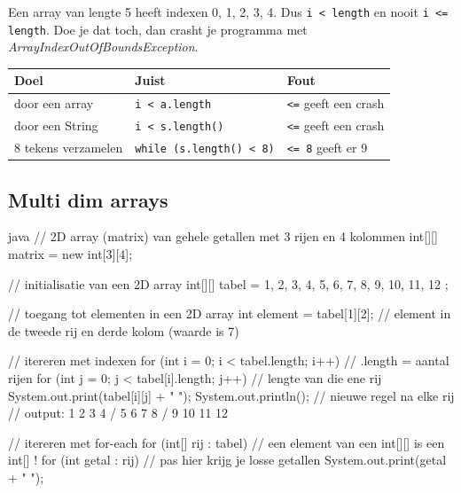 \documentclass[a4paper,11pt]{article}
\begin{document}
\begin{warningbox}
    Een array van lengte 5 heeft indexen 0, 1, 2, 3, 4. Dus \texttt{i < length} en
    nooit \texttt{i <= length}. Doe je dat toch, dan crasht je programma met
    \textit{ArrayIndexOutOfBoundsException}.


    \medskip
    \begin{tabular}{@{}lll@{}}
        \toprule
        \textbf{Doel}       & \textbf{Juist}                  & \textbf{Fout}               \\
        \midrule
        door een array      & \texttt{i < a.length}           & \texttt{<=} geeft een crash \\
        door een String     & \texttt{i < s.length()}         & \texttt{<=} geeft een crash \\
        8 tekens verzamelen & \texttt{while (s.length() < 8)} & \texttt{<= 8} geeft er 9    \\
        \bottomrule
    \end{tabular}
\end{warningbox}


\subsection{Multi dim arrays}

\begin{codeblock}{java}
    // 2D array (matrix) van gehele getallen met 3 rijen en 4 kolommen
    int[][] matrix = new int[3][4];

    // initialisatie van een 2D array
    int[][] tabel = {
    {1, 2, 3, 4},
    {5, 6, 7, 8},
    {9, 10, 11, 12}
    };

    // toegang tot elementen in een 2D array
    int element = tabel[1][2]; // element in de tweede rij en derde kolom (waarde is 7)

    // itereren met indexen
    for (int i = 0; i < tabel.length; i++)      // .length = aantal rijen
        {
            for (int j = 0; j < tabel[i].length; j++) // lengte van die ene rij
                {
                    System.out.print(tabel[i][j] + " ");
                }
            System.out.println(); // nieuwe regel na elke rij
        }
    // output: 1 2 3 4 / 5 6 7 8 / 9 10 11 12

    // itereren met for-each
    for (int[] rij : tabel)   // een element van een int[][] is een int[] !
    {
    for (int getal : rij) // pas hier krijg je losse getallen
        {
            System.out.print(getal + " ");
        }
    }
\end{codeblock}
\end{document}

